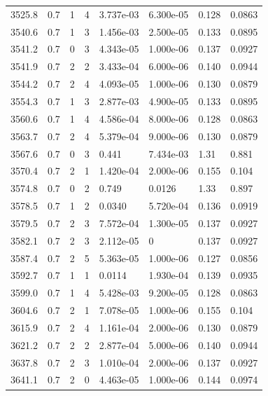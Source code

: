 \documentclass[preview]{standalone}
\begin{document}
{{{{{{{{{{{{{{\begin{tabular}{L{1.2cm}C{1.2cm} C{0.3cm}C{0.5cm} C{1.4cm}C{1.4cm} C{1.4cm}C{1.4cm}}
  3525.8  &   0.7  & 1     &  4 &  3.737e-03  & 6.300e-05  & 0.128 &  0.0863   \\ 
  3540.6  &   0.7  & 1     &  3 &  1.456e-03  & 2.500e-05  & 0.133 &  0.0895   \\ 
  3541.2  &   0.7  & 0     &  3 &  4.343e-05  & 1.000e-06  & 0.137 &  0.0927   \\ 
  3541.9  &   0.7  & 2     &  2 &  3.433e-04  & 6.000e-06  & 0.140 &  0.0944   \\ 
  3544.2  &   0.7  & 2     &  4 &  4.093e-05  & 1.000e-06  & 0.130 &  0.0879   \\ 
  3554.3  &   0.7  & 1     &  3 &  2.877e-03  & 4.900e-05  & 0.133 &  0.0895   \\ 
  3560.6  &   0.7  & 1     &  4 &  4.586e-04  & 8.000e-06  & 0.128 &  0.0863   \\ 
  3563.7  &   0.7  & 2     &  4 &  5.379e-04  & 9.000e-06  & 0.130 &  0.0879   \\ 
  3567.6  &   0.7  & 0     &  3 &  0.441  & 7.434e-03  & 1.31 &  0.881   \\ 
  3570.4  &   0.7  & 2     &  1 &  1.420e-04  & 2.000e-06  & 0.155 &  0.104   \\ 
  3574.8  &   0.7  & 0     &  2 &  0.749  & 0.0126  & 1.33 &  0.897   \\ 
  3578.5  &   0.7  & 1     &  2 &  0.0340  & 5.720e-04  & 0.136 &  0.0919   \\ 
  3579.5  &   0.7  & 2     &  3 &  7.572e-04  & 1.300e-05  & 0.137 &  0.0927   \\ 
  3582.1  &   0.7  & 2     &  3 &  2.112e-05  & 0  & 0.137 &  0.0927   \\ 
  3587.4  &   0.7  & 2     &  5 &  5.363e-05  & 1.000e-06  & 0.127 &  0.0856   \\ 
  3592.7  &   0.7  & 1     &  1 &  0.0114  & 1.930e-04  & 0.139 &  0.0935   \\ 
  3599.0  &   0.7  & 1     &  4 &  5.428e-03  & 9.200e-05  & 0.128 &  0.0863   \\ 
  3604.6  &   0.7  & 2     &  1 &  7.078e-05  & 1.000e-06  & 0.155 &  0.104   \\ 
  3615.9  &   0.7  & 2     &  4 &  1.161e-04  & 2.000e-06  & 0.130 &  0.0879   \\ 
  3621.2  &   0.7  & 2     &  2 &  2.877e-04  & 5.000e-06  & 0.140 &  0.0944   \\ 
  3637.8  &   0.7  & 2     &  3 &  1.010e-04  & 2.000e-06  & 0.137 &  0.0927   \\ 
  3641.1  &   0.7  & 2     &  0 &  4.463e-05  & 1.000e-06  & 0.144 &  0.0974   \\ 

\end{tabular}}}}}}}}}}}}}}}
\end{document}
